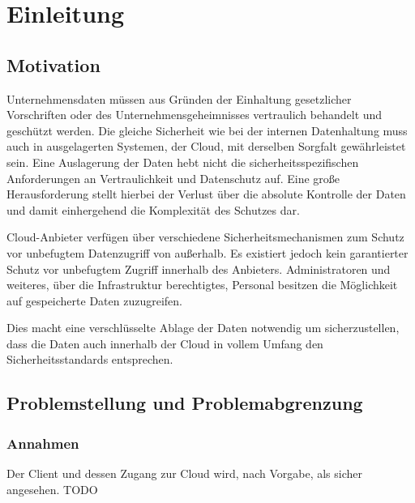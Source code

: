 \documentclass[12pt,a4paper,bibliography=totocnumbered,listof=totocnumbered]{scrartcl}
\begin{document}
\renewcommand{\sectionmark}[1]{\markright{#1}}
\renewcommand{\subsectionmark}[1]{}
\renewcommand{\subsubsectionmark}[1]{}
\rhead{\rightmark}

\doublespacing
\renewcommand{\thesection}{\arabic{section}}
\renewcommand{\theHsection}{\arabic{section}}
\setcounter{section}{0}
\setcounter{page}{1}

\section{Einleitung}
\subsection{Motivation}
Unternehmensdaten müssen aus Gründen der Einhaltung gesetzlicher Vorschriften oder des Unternehmensgeheimnisses vertraulich behandelt und geschützt werden. Die gleiche Sicherheit wie bei der internen Datenhaltung muss auch in ausgelagerten Systemen, der Cloud, mit derselben Sorgfalt gewährleistet sein. Eine Auslagerung der Daten hebt nicht die sicherheitsspezifischen Anforderungen an Vertraulichkeit und Datenschutz auf. Eine große Herausforderung stellt hierbei der Verlust über die absolute Kontrolle der Daten und damit einhergehend die Komplexität des Schutzes dar.

Cloud-Anbieter verfügen über verschiedene Sicherheitsmechanismen zum Schutz vor unbefugtem Datenzugriff von außerhalb. Es existiert jedoch kein garantierter Schutz vor unbefugtem Zugriff innerhalb des Anbieters. Administratoren und weiteres, über die Infrastruktur berechtigtes, Personal besitzen die Möglichkeit auf gespeicherte Daten zuzugreifen.

Dies macht eine verschlüsselte Ablage der Daten notwendig um sicherzustellen, dass die Daten auch innerhalb der Cloud in vollem Umfang den Sicherheitsstandards entsprechen.

\subsection{Problemstellung und Problemabgrenzung}

\subsubsection{Annahmen}
Der Client und dessen Zugang zur Cloud wird, nach Vorgabe, als sicher angesehen. TODO
\end{document}
